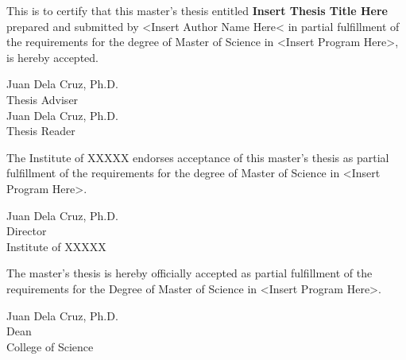 \begin{declaration}
\begin{singlespacing}
This is to certify that this master’s thesis entitled \textbf{Insert Thesis Title Here} prepared and submitted by <Insert Author Name Here< in partial fulfillment of the requirements for the degree of Master of Science in <Insert Program Here>, is hereby accepted.

\begin{flushright}
\vspace{2\baselineskip}
Juan Dela Cruz, Ph.D.\\
Thesis Adviser\\

\vspace{2\baselineskip}
Juan Dela Cruz, Ph.D.\\
Thesis Reader\\
\end{flushright}

\vspace{\baselineskip}

    The Institute of XXXXX endorses acceptance of this master’s thesis as partial fulfillment of the requirements for the degree of Master of Science in <Insert Program Here>.

\begin{flushright}
\vspace{2\baselineskip}
Juan Dela Cruz, Ph.D.\\
Director\\
Institute of XXXXX\\
\end{flushright}

\vspace{\baselineskip}

The master’s thesis is hereby officially accepted as partial fulfillment of the requirements for the Degree of Master of Science in <Insert Program Here>.

\begin{flushright}
\vspace{2\baselineskip}
Juan Dela Cruz, Ph.D.\\
Dean\\
College of Science\\
\end{flushright}
\end{singlespacing}

\end{declaration}

